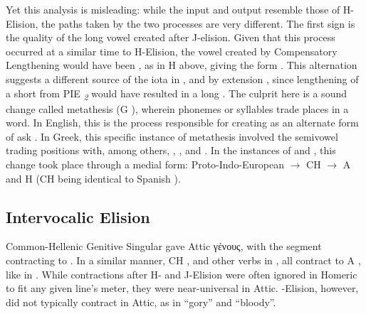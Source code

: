 Yet this analysis is misleading: while the input and output resemble those of H-Elision, the paths taken by the two processes are very different. The first sign is the quality of the long vowel created after J-elision. Given that this process occurred at a similar time to H-Elision, the vowel created by Compensatory Lengthening would have been , as in H  above, giving the form .  This alternation suggests a different source of the iota  in , and by extension , since lengthening of a short  from PIE \textit{\textsubscript{2}} would have resulted in a long . The culprit here is a sound change called metathesis (G ), wherein phonemes or syllables trade places in a word. In English, this is the process responsible for creating  as an alternate form  of ask . In Greek, this specific instance of metathesis involved the semivowel  trading positions with,  among others, , , and . In the instances of  and , this change took place through a medial form: Proto-Indo-European  $\to$ CH  $\to$ A and H  (CH  being identical to Spanish ).

\subsection{Intervocalic Elision}
Common-Hellenic Genitive Singular  gave Attic γένους,\autocite[172]{Sihler_1995} with the segment  contracting to . In a similar manner, CH , and other verbs in , all contract to A , like in . While contractions after H- and J-Elision were often ignored in Homeric to fit any given line's meter, they were near-universal in Attic. \W-Elision, however, did not typically contract in Attic, as in  ``gory'' and  ``bloody''.

